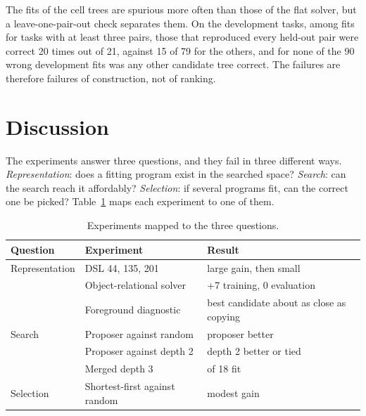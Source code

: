 \documentclass[sigconf,nonacm]{acmart}
\begin{document}
The fits of the cell trees are spurious more often than those of the flat solver, but a leave-one-pair-out check separates them. On the development tasks, among fits for tasks with at least three pairs, those that reproduced every held-out pair were correct 20 times out of 21, against 15 of 79 for the others, and for none of the 90 wrong development fits was any other candidate tree correct. The failures are therefore failures of construction, not of ranking.

\section{Discussion}

\label{sec:disc-top}The experiments answer three questions, and they fail in three different ways. \emph{Representation}: does a fitting program exist in the searched space? \emph{Search}: can the search reach it affordably? \emph{Selection}: if several programs fit, can the correct one be picked? Table~\ref{tab:rss} maps each experiment to one of them.

\begin{table}[t]
\caption{Experiments mapped to the three questions.}
\label{tab:rss}
\footnotesize\setlength{\tabcolsep}{4pt}
\begin{tabular}{@{}>{\raggedright\arraybackslash}p{1.4cm}>{\raggedright\arraybackslash}p{3.0cm}>{\raggedright\arraybackslash}p{2.9cm}@{}}
\toprule
Question & Experiment & Result \\
\midrule
Representation & DSL 44, 135, 201 & large gain, then small \\
 & Object-relational solver & +7 training, 0 evaluation \\
 & Foreground diagnostic & best candidate about as close as copying \\
Search & Proposer against random & proposer better \\
 & Proposer against depth 2 & depth 2 better or tied \\
 & Merged depth 3 & 0 of 18 fit \\
Selection & Shortest-first against random & modest gain \\
\bottomrule
\end{tabular}
\end{table}
\end{document}
